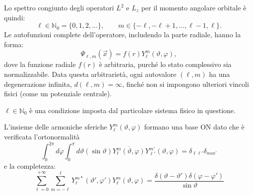 Lo spettro congiunto degli operatori \(L^2\) e \(L_z\) per il momento angolare orbitale è quindi:
\begin{equation}
    \ell \in \mathbb{N}_0 = \{0, 1, 2, \dots\}, \qquad m \in \{-\ell, -\ell + 1, \dots, \ell - 1, \ell\}.
\end{equation}
Le autofunzioni complete dell'operatore, includendo la parte radiale, hanno la forma:
\[
    \Psi_{\ell,m}(\vec{x}) = f(r) Y_{\ell}^m(\vartheta, \varphi),
\]
dove la funzione radiale \(f(r)\) è arbitraria, purché lo stato complessivo sia normalizzabile.
Data questa arbitrarietà, ogni autovalore \((\ell, m)\) ha una degenerazione infinita, \(d(\ell, m) = \infty\), finché non si impongono ulteriori vincoli fisici (come un potenziale centrale).

\begin{attention}
    \(\ell \in \mathbb{N}_0\) è una condizione imposta dal particolare sistema fisico in questione.
\end{attention}
L'insieme delle armoniche sferiche \(Y_{\ell}^m(\vartheta, \varphi)\) formano una base ON dato che è verificata l'ortonormalità
\[
    \int_{0}^{2\pi} d\varphi \int_{0}^{\pi} d\vartheta (\sin\vartheta) \overline{Y_{\ell}^{m}(\vartheta, \varphi)} Y_{\ell'}^{m'}(\vartheta, \varphi) = \delta_{\ell\ell'} \delta_{mm'}
\]
e la completezza:
\[
    \sum_{\ell=0}^{+\infty} \sum_{m=-\ell}^{\ell} Y_{\ell}^{m*}(\vartheta', \varphi') Y_{\ell}^{m}(\vartheta, \varphi) = \frac{\delta(\vartheta - \vartheta')\delta(\varphi - \varphi')}{\sin\vartheta}
\]

